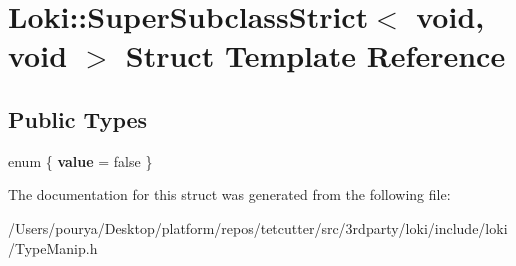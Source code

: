 \hypertarget{structLoki_1_1SuperSubclassStrict_3_01void_00_01void_01_4}{}\section{Loki\+:\+:Super\+Subclass\+Strict$<$ void, void $>$ Struct Template Reference}
\label{structLoki_1_1SuperSubclassStrict_3_01void_00_01void_01_4}
\subsection*{Public Types}
\begin{DoxyCompactItemize}
\item 
\hypertarget{structLoki_1_1SuperSubclassStrict_3_01void_00_01void_01_4_af98dc2b96b6281cafa1b954da4f10b14}{}enum \{ {\bfseries value} = false
 \}\label{structLoki_1_1SuperSubclassStrict_3_01void_00_01void_01_4_af98dc2b96b6281cafa1b954da4f10b14}

\end{DoxyCompactItemize}


The documentation for this struct was generated from the following file\+:\begin{DoxyCompactItemize}
\item 
/\+Users/pourya/\+Desktop/platform/repos/tetcutter/src/3rdparty/loki/include/loki/Type\+Manip.\+h\end{DoxyCompactItemize}
